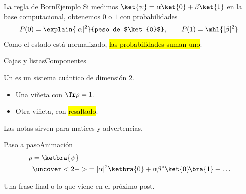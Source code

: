 \documentclass[12pt]{beamer}
\begin{document}

\begin{frame}{La regla de Born}{Ejemplo}
Si medimos $\ket{\psi} = \alpha\ket{0} + \beta\ket{1}$ en la base
computacional, obtenemos $0$ o $1$ con probabilidades
\[
  P(0) = \explain{|\alpha|^2}{peso de $\ket{0}$},
  \qquad
  P(1) = \mhl{|\beta|^2}.
\]
Como el estado está normalizado, \hl{las probabilidades suman uno}:
\end{frame}

\begin{frame}{Cajas y listas}{Componentes}
\begin{defbox}[Definición]
Un  es un sistema cuántico de dimensión $2$.
\end{defbox}
\begin{itemize}
  \item Una viñeta con $\Tr\rho = 1$.
  \item Otra viñeta, con \hl{resaltado}.
\end{itemize}
\begin{notebox}[Nota]
Las notas sirven para matices y advertencias.
\end{notebox}
\end{frame}

\begin{frame}{Paso a paso}{Animación}
\begin{align*}
  \rho &= \ketbra{\psi}\\
       &\uncover<2->{= |\alpha|^2\ketbra{0} + \alpha\beta^*\ket{0}\!\bra{1} + \dots}
\end{align*}
\end{frame}

  {Una frase final o lo que viene en el próximo post.}
\end{document}
